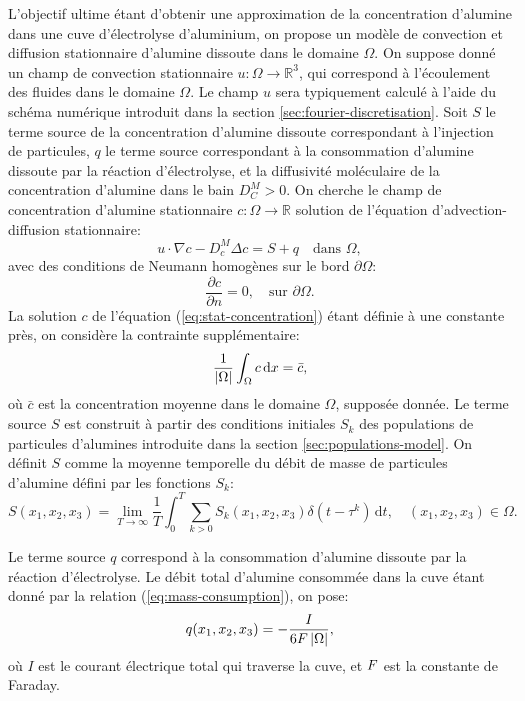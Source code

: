 L'objectif ultime étant d'obtenir une approximation de la
concentration d'alumine dans une cuve d'électrolyse d'aluminium, on
propose un modèle de convection et diffusion stationnaire d'alumine
dissoute dans le domaine $\Omega$.  On suppose donné un champ de
convection stationnaire $u:\Omega\to\mathbb R^3$, qui correspond à
l'écoulement des fluides dans le domaine $\Omega$. Le champ $u$ sera
typiquement calculé à l'aide du schéma numérique introduit dans la
section \ref{sec:fourier-discretisation}.  Soit $S$ le terme source de
la concentration d'alumine dissoute correspondant à l'injection de
particules, $q$ le terme source correspondant à la consommation
d'alumine dissoute par la réaction d'électrolyse, et la diffusivité
moléculaire de la concentration d'alumine dans le bain $D_C^M > 0$.
On cherche le champ de concentration d'alumine stationnaire
$c:\Omega\to\mathbb R$ solution de l'équation d'advection-diffusion
stationnaire:
\begin{equation}\label{eq:stat-concentration}
  u\cdot \nabla c - D_c^M \Delta c = S + q\quad \text{dans } \Omega,
\end{equation}
avec des conditions de Neumann homogènes sur le bord $\partial
\Omega$:
\begin{equation}
  \frac{\partial c}{\partial n} = 0,\quad\text{sur } \partial \Omega.
\end{equation}
La solution $c$ de l'équation (\ref{eq:stat-concentration}) étant
définie à une constante près, on considère la contrainte
supplémentaire:
\begin{equation}\label{eq:stat-alumina-avg-c}
  \frac{1}{\left\lvert \Omega \right\rvert}\int_\Omega c\,\mathrm dx = \bar c,
\end{equation}
où $\bar c$ est la concentration moyenne dans le domaine $\Omega$,
supposée donnée.
Le terme source $S$ est construit à partir des conditions initiales
$S_k$ des populations de particules d'alumines introduite dans la
section \ref{sec:populations-model}. On définit $S$ comme la moyenne
temporelle du débit de masse de particules d'alumine défini par
les fonctions $S_k$:
\begin{equation}
  S(x_1,x_2,x_3) = \lim_{T\to\infty}\frac{1}{T}\int_0^T \sum_{k>0}
  S_k(x_1, x_2, x_3) \delta(t - \tau^k)\,\mathrm dt, \quad (x_1, x_2, x_3)\in\Omega.
\end{equation}

Le terme source $q$ correspond à la consommation d'alumine
dissoute par la réaction d'électrolyse. Le débit total d'alumine
consommée dans la cuve étant donné par la relation
(\ref{eq:mass-consumption}), on pose:
\begin{equation}\label{eq:stat-alumina-consommation}
  q(x_1, x_2, x_3) = -\frac{I}{6F\left\lvert \Omega \right\rvert},
\end{equation}
où $I$ est le courant électrique total qui traverse la cuve, et
$F$ est la constante de Faraday.

